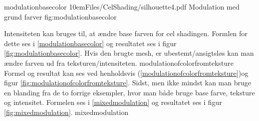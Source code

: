  {modulationbasecolor} 
 {10em}{Files/CelShading/silhouette4.pdf} {Modulation med grund farver} {fig:modulationbasecolor}


Intensiteten kan bruges til, at ændre base farven for cel shadingen. Formlen for dette ses i \ref{modulationbasecolor} og resultatet ses i figur \ref{fig:modulationbasecolor}. 
Hvis den brugte mesh, er ubestemt/ansigtsløs kan man ændre farven ud fra teksturen/intensiteten. 
 {modulationofcolorfromteksture}
Formel og resultat kan ses ved henholdsvis (\ref{modulationofcolorfromteksture})og figur \ref{fig:modulationofcolorfromteksture}. Sidst, men ikke mindst kan man bruge en blanding fra de to forrige eksempler, hvor man både bruge base farve, teksture og intensitet. Formelen ses i \ref{mixedmodulation} og resultatet ses i figur \ref{fig:mixedmodulation}.
 {mixedmodulation}
\newpage%

 
